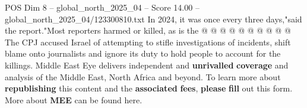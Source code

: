 \begin{textsample}{POS Dim 8 – global\_north\_2025\_04 – Score 14.00 – global\_north\_2025\_04/123300810.txt}
In 2024, it was once every three days,"said the report."Most reporters harmed or killed, as is the @ @ @ @ @ @ @ @ @ @ The CPJ accused Israel of attempting to stifle investigations of incidents, shift blame onto journalists and ignore its duty to hold people to account for the killings.
Middle East Eye delivers independent and \textbf{unrivalled} \textbf{coverage} and analysis of the Middle East, North Africa and beyond.
To learn more about \textbf{republishing} this content and the \textbf{associated} \textbf{fees}, \textbf{please} \textbf{fill} out this form.
More about \textbf{MEE} can be found here.

\end{textsample}
